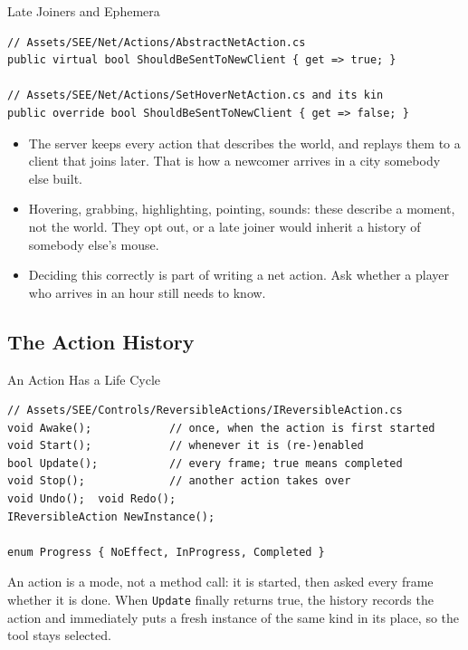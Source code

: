 \begin{frame}[fragile]{Late Joiners and Ephemera}
  \begin{lstlisting}[basicstyle=\scriptsize\ttfamily]
// Assets/SEE/Net/Actions/AbstractNetAction.cs
public virtual bool ShouldBeSentToNewClient { get => true; }

// Assets/SEE/Net/Actions/SetHoverNetAction.cs and its kin
public override bool ShouldBeSentToNewClient { get => false; }
  \end{lstlisting}
  \vspace{1ex}

  \begin{itemize}
    \item The server keeps every action that describes the world, and replays
      them to a client that joins later. That is how a newcomer arrives in a
      city somebody else built.
    \item Hovering, grabbing, highlighting, pointing, sounds: these describe a
      moment, not the world. They opt out, or a late joiner would inherit a
      history of somebody else's mouse.
    \item Deciding this correctly is part of writing a net action. Ask whether
      a player who arrives in an hour still needs to know.
  \end{itemize}
\end{frame}

\subsection{The Action History}

\begin{frame}[fragile]{An Action Has a Life Cycle}
  \begin{lstlisting}[basicstyle=\scriptsize\ttfamily]
// Assets/SEE/Controls/ReversibleActions/IReversibleAction.cs
void Awake();            // once, when the action is first started
void Start();            // whenever it is (re-)enabled
bool Update();           // every frame; true means completed
void Stop();             // another action takes over
void Undo();  void Redo();
IReversibleAction NewInstance();

enum Progress { NoEffect, InProgress, Completed }
  \end{lstlisting}
  \vspace{1ex}

  An action is a mode, not a method call: it is started, then asked every
  frame whether it is done. When \texttt{Update} finally returns true, the
  history records the action and immediately puts a fresh instance of the same
  kind in its place, so the tool stays selected.
\end{frame}

